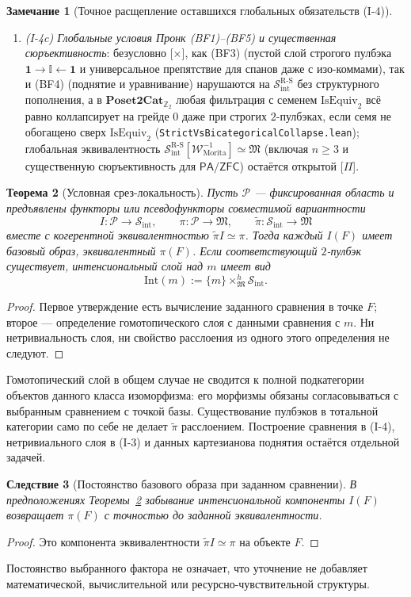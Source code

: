 \documentclass[11pt]{article}
\theoremstyle{plain}
\newtheorem{theorem}{Теорема}[section]
\newtheorem{corollary}[theorem]{Следствие}
\theoremstyle{definition}
\newtheorem{remark}[theorem]{Замечание}
\newcommand{\RS}{\mathrm{R\text{-}S}}
\newcommand{\cS}{\mathcal{S}}
\newcommand{\fM}{\mathfrak{M}}
\newcommand{\Sint}{\cS_{\mathrm{int}}}
\newcommand{\PA}{\mathsf{PA}}
\newcommand{\ZFC}{\mathsf{ZFC}}
\newcommand{\tpi}{\widetilde{\pi}}
\begin{document}
\begin{remark}[Точное расщепление оставшихся глобальных обязательств (I-4)]
\begin{enumerate}[nosep,label=\textup{(\alph*)}]
\item \emph{\textup{(I-4c)} Глобальные условия Пронк \textup{(BF1)--(BF5)} и существенная сюръективность}: безусловно \textup{[\textbf{$\times$}]}, как \textup{(BF3)} (пустой слой строгого пулбэка $\mathbf{1} \to \mathbb{I} \leftarrow \mathbf{1}$ и универсальное препятствие для спанов даже с изо-коммами), так и \textup{(BF4)} (поднятие и уравнивание) нарушаются на $\Sint^{\RS}$ без структурного пополнения, а в $\mathbf{Poset2Cat}_{\mathbb{Z}_2}$ любая фильтрация с семенем $\mathrm{IsEquiv}_2$ всё равно коллапсирует на грейде $0$ даже при строгих $2$-пулбэках, если семя не обогащено сверх $\mathrm{IsEquiv}_2$ (\texttt{StrictVsBicategoricalCollapse.lean}); глобальная эквивалентность $\Sint^{\RS}[\mathcal{W}_{\mathrm{Morita}}^{-1}] \simeq \fM$ (включая $n \ge 3$ и существенную сюръективность для $\PA/\ZFC$) остаётся открытой \textup{[\textbf{$\Pi$}]}.
\end{enumerate}
\end{remark}

\begin{theorem}[Условная срез-локальность]\label{thm:slice-locality}
Пусть $\mathcal P$ — фиксированная область и предъявлены функторы или псевдофункторы совместимой вариантности
\[
 I : \mathcal P \to \Sint,\qquad \pi : \mathcal P \to \fM,
 \qquad \tpi : \Sint \to \fM
\]
вместе с когерентной эквивалентностью $\tpi I \simeq \pi$. Тогда каждый $I(F)$ имеет базовый образ, эквивалентный $\pi(F)$. Если соответствующий $2$-пулбэк существует, интенсиональный слой над $m$ имеет вид
\[
 \mathrm{Int}(m) := \{m\} \mathbin{\times}^{h}_{\fM} \Sint.
\]
\end{theorem}
\begin{proof}
Первое утверждение есть вычисление заданного сравнения в точке $F$; второе — определение гомотопического слоя с данными сравнения с $m$. Ни нетривиальность слоя, ни свойство расслоения из одного этого определения не следуют.
\end{proof}
Гомотопический слой в общем случае не сводится к полной подкатегории объектов данного класса изоморфизма: его морфизмы обязаны согласовываться с выбранным сравнением с точкой базы. Существование пулбэков в тотальной категории само по себе не делает $\tpi$ расслоением. Построение сравнения в (I-4), нетривиального слоя в (I-3) и данных картезианова поднятия остаётся отдельной задачей.

\begin{corollary}[Постоянство базового образа при заданном сравнении]\label{cor:slice-level}
В предположениях Теоремы~\ref{thm:slice-locality} забывание интенсиональной компоненты $I(F)$ возвращает $\pi(F)$ с точностью до заданной эквивалентности.
\end{corollary}
\begin{proof}
Это компонента эквивалентности $\tpi I \simeq \pi$ на объекте $F$.
\end{proof}
Постоянство выбранного фактора не означает, что уточнение не добавляет математической, вычислительной или ресурсно-чувствительной структуры.
\end{document}
